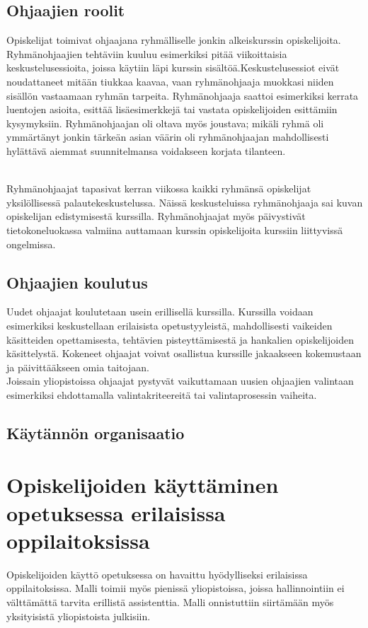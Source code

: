 \documentclass[finnish]{tktltiki2}
\theoremstyle{definition}
\theoremstyle{remark}
\begin{document}
\subsection{Ohjaajien roolit}
Opiskelijat toimivat ohjaajana ryhmälliselle jonkin alkeiskurssin opiskelijoita. Ryhmänohjaajien tehtäviin kuuluu esimerkiksi pitää viikoittaisia keskustelusessioita, joissa käytiin läpi kurssin sisältöä.Keskustelusessiot eivät noudattaneet mitään tiukkaa kaavaa, vaan ryhmänohjaaja muokkasi niiden sisällön vastaamaan ryhmän tarpeita. Ryhmänohjaaja saattoi esimerkiksi kerrata luentojen asioita, esittää lisäesimerkkejä tai vastata opiskelijoiden esittämiin kysymyksiin. Ryhmänohjaajan oli oltava myös joustava; mikäli ryhmä oli ymmärtänyt jonkin tärkeän asian väärin oli ryhmänohjaajan mahdollisesti hylättävä aiemmat suunnitelmansa voidakseen korjata tilanteen.

\\

Ryhmänohjaajat tapasivat kerran viikossa kaikki ryhmänsä opiskelijat yksilöllisessä palautekeskustelussa. Näissä keskusteluissa ryhmänohjaaja sai kuvan opiskelijan edistymisestä kurssilla. Ryhmänohjaajat myös päivystivät tietokoneluokassa valmiina auttamaan kurssin opiskelijoita kurssiin liittyvissä ongelmissa.



\subsection{Ohjaajien koulutus}
Uudet ohjaajat koulutetaan usein erillisellä kurssilla. Kurssilla voidaan esimerkiksi keskustellaan erilaisista opetustyyleistä, mahdollisesti vaikeiden käsitteiden opettamisesta, tehtävien pisteyttämisestä ja hankalien opiskelijoiden käsittelystä. Kokeneet ohjaajat voivat osallistua kurssille jakaakseen kokemustaan ja päivittääkseen omia taitojaan.
\\
Joissain yliopistoissa ohjaajat pystyvät vaikuttamaan uusien ohjaajien valintaan esimerkiksi ehdottamalla valintakriteereitä tai valintaprosessin vaiheita.


\subsection{Käytännön organisaatio}





\section{Opiskelijoiden käyttäminen opetuksessa erilaisissa oppilaitoksissa}
Opiskelijoiden käyttö opetuksessa on havaittu hyödylliseksi erilaisissa oppilaitoksissa. Malli toimii myös pienissä yliopistoissa, joissa hallinnointiin ei välttämättä tarvita erillistä assistenttia. Malli onnistuttiin siirtämään myös yksityisistä yliopistoista julkisiin.
\end{document}
